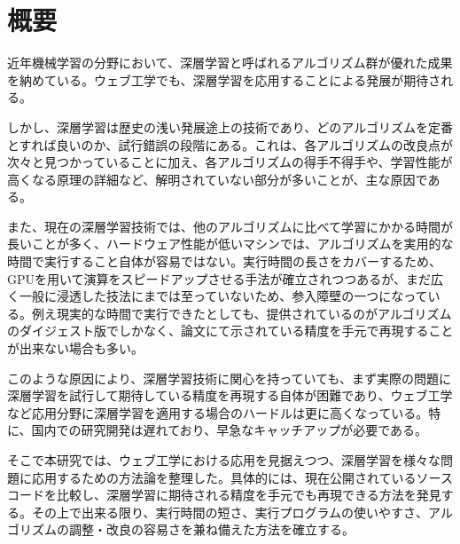\chapter*{概要}
近年機械学習の分野において、深層学習と呼ばれるアルゴリズム群が優れた成果を納めている。ウェブ工学でも、深層学習を応用することによる発展が期待される。\par
しかし、深層学習は歴史の浅い発展途上の技術であり、どのアルゴリズムを定番とすれば良いのか、試行錯誤の段階にある。これは、各アルゴリズムの改良点が次々と見つかっていることに加え、各アルゴリズムの得手不得手や、学習性能が高くなる原理の詳細など、解明されていない部分が多いことが、主な原因である。\par
また、現在の深層学習技術では、他のアルゴリズムに比べて学習にかかる時間が長いことが多く、ハードウェア性能が低いマシンでは、アルゴリズムを実用的な時間で実行すること自体が容易ではない。実行時間の長さをカバーするため、GPUを用いて演算をスピードアップさせる手法が確立されつつあるが、まだ広く一般に浸透した技法にまでは至っていないため、参入障壁の一つになっている。例え現実的な時間で実行できたとしても、提供されているのがアルゴリズムのダイジェスト版でしかなく、論文にて示されている精度を手元で再現することが出来ない場合も多い。\par
このような原因により、深層学習技術に関心を持っていても、まず実際の問題に深層学習を試行して期待している精度を再現する自体が困難であり、ウェブ工学など応用分野に深層学習を適用する場合のハードルは更に高くなっている。特に、国内での研究開発は遅れており、早急なキャッチアップが必要である。\par
そこで本研究では、ウェブ工学における応用を見据えつつ、深層学習を様々な問題に応用するための方法論を整理した。具体的には、現在公開されているソースコードを比較し、深層学習に期待される精度を手元でも再現できる方法を発見する。その上で出来る限り、実行時間の短さ、実行プログラムの使いやすさ、アルゴリズムの調整・改良の容易さを兼ね備えた方法を確立する。

\begin{comment}このような原因により、深層学習技術に関心を持っていても、まず実際の問題に深層学習を試行すること自体が困難であり、応用技術開発のハードルは更に高くなっている。アルゴリズムが開発途上で確定できていないため、公開されているライブラリも、現状では、開発用途や実験的なものが多くなってしまっている。そもそも有力なアルゴリズムに対応する実装が用意されていない場合や、問題に応じて自らアルゴリズムの細部を調整しなければならない場合もある。ライブラリがGPU専用に書かれていることが徒となり、GPUを持っていないと実行自体ができなくなることも考えられる。例え実行するところまで到達できたとしても、提供されているのがアルゴリズムのダイジェスト版でしかなく、論文にて示されている精度を手元で再現することが出来ない場合も多い。標準と言える公開ライブラリが確立していない状況なので、ウェブ工学など応用分野に深層学習を適用したいと考えても、プログラム開発に長い時間がかかってしまい、開発における大きな障壁となっている。特に、国内での研究開発は遅れており、早急なキャッチアップが必要である。
\end{comment}
